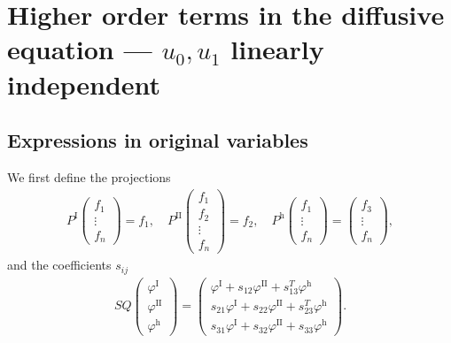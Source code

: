 \documentclass[11pt]{article}
\renewcommand{\phi}{\varphi}
\numberwithin{equation}{section}
\numberwithin{prop}{section}
\newcommand{\phih}{\phi^\mathrm{h}}
\newcommand{\phiI}{\phi^\mathrm{I}}
\newcommand{\phiII}{\phi^\mathrm{II}}
\newcommand{\PI}{P^\mathrm{I}}
\newcommand{\Ph}{P^\mathrm{h}}
\newcommand{\PII}{P^\mathrm{II}}
\begin{document}
\section{Higher order terms in the diffusive equation --- $u_0, u_1$ linearly independent}\label{app: lin ind}

\subsection{Expressions in original variables}
We first define the projections
\begin{align*}
\PI \begin{pmatrix}
f_1 \\ \vdots \\ f_n 
\end{pmatrix} = f_1, 
\quad 
\PII \begin{pmatrix}
f_1 \\ 
f_2 \\ 
\vdots \\ f_n
\end{pmatrix} = f_2, \quad 
\Ph \begin{pmatrix} f_1 \\ \vdots \\ f_n 
\end{pmatrix}
= \begin{pmatrix}
f_3 \\ \vdots \\ f_n 
\end{pmatrix},
\end{align*}
and the coefficients $s_{ij}$ 
\begin{align}
SQ \begin{pmatrix}
\phiI \\ \phiII \\ \phih 
\end{pmatrix} = \begin{pmatrix}
\phiI + s_{12} \phiII + s_{13}^T \phih \\
s_{21} \phiI + s_{22} \phiII + s_{23}^T \phih \\ 
s_{31} \phiI + s_{32} \phiII + s_{33} \phih
\end{pmatrix}. 
\end{align}
\end{document}
